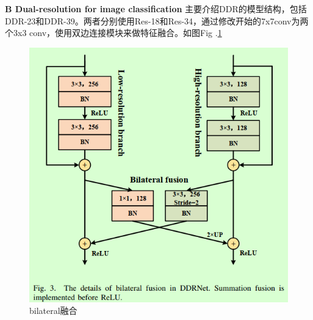 \documentclass{article}
\begin{document}
\textbf{B Dual-resolution for image classification}
主要介绍DDR的模型结构，包括DDR-23和DDR-39。两者分别使用Res-18和Res-34，通过修改开始的7x7conv为两个3x3 conv，使用双边连接模块来做特征融合。如图Fig .\ref{Fig.ddr_bilateral}
\begin{figure}
\centering
\includegraphics[scale=0.3]{image/DDR_bilateral.png}
\caption{bilateral融合}
\label{Fig.ddr_bilateral}
\end{figure}
\end{document}
